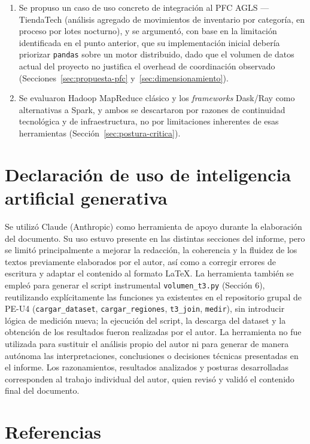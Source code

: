 \documentclass[11pt,a4paper]{article}
\begin{document}
\begin{enumerate}
        \item Se propuso un caso de uso concreto de integración al PFC
        AGLS --- TiendaTech (análisis agregado de movimientos de
        inventario por categoría, en proceso por lotes nocturno), y se
        argumentó, con base en la limitación identificada en el punto
        anterior, que su implementación inicial debería priorizar
        \texttt{pandas} sobre un motor distribuido, dado que el volumen de
        datos actual del proyecto no justifica el overhead de coordinación
        observado (Secciones~\ref{sec:propuesta-pfc}
        y~\ref{sec:dimensionamiento}).

        \item Se evaluaron Hadoop MapReduce clásico y los \emph{frameworks}
        Dask/Ray como alternativas a Spark, y ambos se descartaron por
        razones de continuidad tecnológica y de infraestructura, no por
        limitaciones inherentes de esas herramientas
        (Sección~\ref{sec:postura-critica}).
    \end{enumerate}

    \section{Declaración de uso de inteligencia artificial generativa}
    \label{sec:declaracion-ia}

    Se utilizó Claude (Anthropic) como herramienta de apoyo durante la elaboración
    del documento. Su uso estuvo presente en las distintas secciones del informe,
    pero se limitó principalmente a mejorar la redacción, la coherencia y la fluidez
    de los textos previamente elaborados por el autor, así como a corregir errores de
    escritura y adaptar el contenido al formato LaTeX. La herramienta también se empleó
    para generar el script instrumental \texttt{volumen\_t3.py} (Sección 6), reutilizando
    explícitamente las funciones ya existentes en el repositorio grupal de PE-U4
    (\texttt{cargar\_dataset}, \texttt{cargar\_regiones}, \texttt{t3\_join}, \texttt{medir}),
    sin introducir lógica de medición nueva; la ejecución del script, la descarga del
    dataset y la obtención de los resultados fueron realizadas por el autor. La
    herramienta no fue utilizada para sustituir el análisis propio del autor ni para
    generar de manera autónoma las interpretaciones, conclusiones o decisiones técnicas
    presentadas en el informe. Los razonamientos, resultados analizados y posturas
    desarrolladas corresponden al trabajo individual del autor, quien revisó y validó
    el contenido final del documento.


    \section{Referencias}
    \label{sec:referencias}

    \printbibliography[heading=none]

\end{document}
